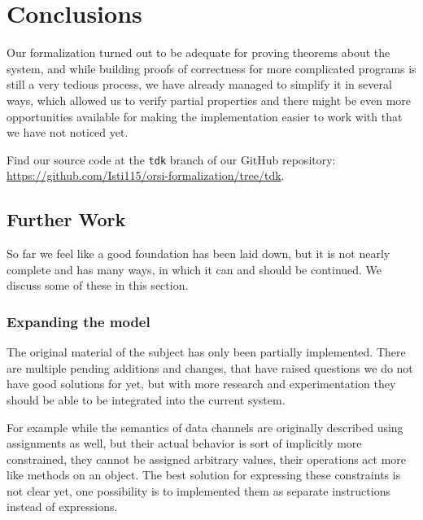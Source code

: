\chapter{Conclusions}
\label{chp:conclusions}

Our formalization turned out to be adequate for proving theorems about the system, and while building proofs of correctness for more complicated programs is still a very tedious process, we have already managed to simplify it in several ways, which allowed us to verify partial properties and there might be even more opportunities available for making the implementation easier to work with that we have not noticed yet.

Find our source code at the \verb|tdk| branch of our GitHub repository: \url{https://github.com/Isti115/orsi-formalization/tree/tdk}.

\section{Further Work}

So far we feel like a good foundation has been laid down, but it is not nearly complete and has many ways, in which it can and should be continued. We discuss some of these in this section.

\subsection{Expanding the model}

The original material of the subject has only been partially implemented. There are multiple pending additions and changes, that have raised questions we do not have good solutions for yet, but with more research and experimentation they should be able to be integrated into the current system.

For example while the semantics of data channels are originally described using assignments as well, but their actual behavior is sort of implicitly more constrained, they cannot be assigned arbitrary values, their operations act more like methods on an object. The best solution for expressing these constraints is not clear yet, one possibility is to implemented them as separate instructions instead of expressions.

